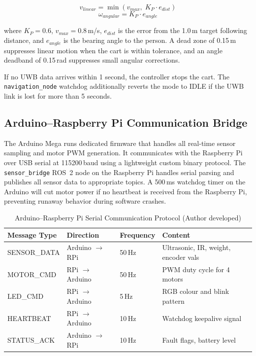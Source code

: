 \begin{equation}
  v_{linear} = \min(v_{max},\; K_P \cdot e_{dist})
\end{equation}
\begin{equation}
  \omega_{angular} = K_P \cdot e_{angle}
\end{equation}

where $K_P = 0.6$, $v_{max} = 0.8$\,m/s, $e_{dist}$ is the error 
from the 1.0\,m target following distance, and $e_{angle}$ is the 
bearing angle to the person. A dead zone of 0.15\,m suppresses 
linear motion when the cart is within tolerance, and an angle 
deadband of 0.15\,rad suppresses small angular corrections.

If no UWB data arrives within 1 second, the controller stops the 
cart. The \texttt{navigation\_node} watchdog additionally reverts 
the mode to IDLE if the UWB link is lost for more than 5 seconds.


\subsection{Arduino--Raspberry Pi Communication Bridge}

The Arduino Mega runs dedicated firmware that handles all real-time sensor
sampling and motor PWM generation. It communicates with the Raspberry Pi
over USB serial at 115200\,baud using a lightweight custom binary
protocol. The \texttt{sensor\_bridge} ROS~2 node on the Raspberry Pi
handles serial parsing and publishes all sensor data to appropriate
topics. A 500\,ms watchdog timer on the Arduino will cut motor power if
no heartbeat is received from the Raspberry Pi, preventing runaway
behavior during software crashes.

\begin{table}[!ht]
\caption{Arduino--Raspberry Pi Serial Communication Protocol (Author developed)}
\label{tab:serial}
\centering
\footnotesize
\begin{tabular}{p{1.8cm} p{1.6cm} p{1.3cm} p{2.0cm}}
\toprule
\textbf{Message Type} & \textbf{Direction} & \textbf{Frequency} & \textbf{Content} \\
\midrule
SENSOR\_DATA & Arduino $\to$ RPi & 50\,Hz & Ultrasonic, IR, weight, encoder vals \\
MOTOR\_CMD   & RPi $\to$ Arduino & 50\,Hz & PWM duty cycle for 4 motors \\
LED\_CMD     & RPi $\to$ Arduino & 5\,Hz  & RGB colour and blink pattern \\
HEARTBEAT    & RPi $\to$ Arduino & 10\,Hz & Watchdog keepalive signal \\
STATUS\_ACK  & Arduino $\to$ RPi & 10\,Hz & Fault flags, battery level \\
\bottomrule
\end{tabular}
\end{table}

